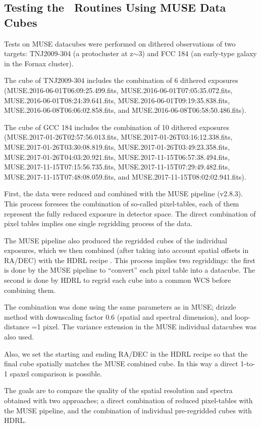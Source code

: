 \subsection{Testing the \hdrlresample\ Routines Using MUSE Data Cubes}

Tests on MUSE datacubes were performed on dithered observations of two
targets: TNJ2009-304 (a protocluster at z$\sim$3) and FCC 184 (an
early-type galaxy in the Fornax cluster).

The cube of TNJ2009-304 includes the combination of 6 dithered
exposures (MUSE.2016-06-01T06:09:25.499.fits,
MUSE.2016-06-01T07:05:35.072.fits, MUSE.2016-06-01T08:24:39.641.fits,
MUSE.2016-06-01T09:19:35.838.fits, MUSE.2016-06-08T06:06:02.858.fits,
and MUSE.2016-06-08T06:58:50.486.fits).

 The cube of GCC 184 includes
the combination of 10 dithered exposures
(MUSE.2017-01-26T02:57:56.013.fits, MUSE.2017-01-26T03:16:12.338.fits,
MUSE.2017-01-26T03:30:08.819.fits, MUSE.2017-01-26T03:49:23.358.fits,
MUSE.2017-01-26T04:03:20.921.fits, MUSE.2017-11-15T06:57:38.494.fits,
MUSE.2017-11-15T07:15:56.735.fits, MUSE.2017-11-15T07:29:49.482.fits,
MUSE.2017-11-15T07:48:08.059.fits, and
MUSE.2017-11-15T08:02:02.941.fits).


First, the data were reduced and combined with the MUSE pipeline
(v2.8.3). This process foresees the combination of so-called
pixel-tables, each of them represent the fully reduced exposure in
detector space. The direct combination of pixel tables implies one
single regridding process of the data.


The MUSE pipeline also produced the regridded cubes of the individual
exposures, which we then combined (after taking into account spatial
offsets in RA/DEC) with the HDRL recipe \hdrlresample. This process
implies two regriddings: the first is done by the MUSE pipeline to
``convert'' each pixel table into a datacube. The second is done by
HDRL to regrid each cube into a common WCS before combining them.

The combination was done using the same parameters as in MUSE; drizzle
method with downscaling factor 0.6 (spatial and spectral dimension),
and loop-distance =1 pixel. The variance extension in the MUSE
individual datacubes was also used.

Also, we set the starting and ending RA/DEC in the HDRL recipe so that
the final cube spatially matches the MUSE combined cube.  In this way a
direct 1-to-1 spaxel comparison is possible.

The goals are to compare the quality of the spatial resolution and
spectra obtained with two approaches; a direct combination of reduced
pixel-tables with the MUSE pipeline, and the combination of individual
pre-regridded cubes with HDRL.


